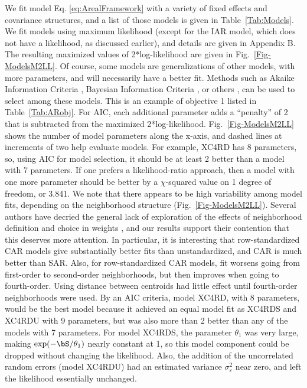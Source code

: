 We fit model Eq. \ref{eq:ArealFramework} with a variety of fixed effects and covariance structures, and a list of those models is given in Table~\ref{Tab:Models}.  We fit models using maximum likelihood (except for the IAR model, which does not have a likelihood, as discussed earlier), and details are given in Appendix B. The resulting maximized values of 2*log-likelihood are given in Fig.~\ref{Fig-ModelsM2LL}. Of course, some models are generalizations of other models, with more parameters, and will necessarily have a better fit.  Methods such as Akaike Information Criteria \citep[AIC,][]{Akai:Info:1973}, Bayesian Information Criteria \citep[BIC,][]{Schw:esti:1978}, or others \citep[see, e.g.,][]{Burn:Ande:mode:2002,Hoot:Hobb:guid:2015}, can be used to select among these models. This is an example of objective 1 listed in Table~\ref{Tab:ARobj}. For AIC, each additional parameter adds a ``penalty'' of 2 that is subtracted from the maximized 2*log-likelihood.  Fig.~\ref{Fig-ModelsM2LL} shows the number of model parameters along the x-axis, and dashed lines at increments of two help evaluate models. For example, XC4RD has 8 parameters, so, using AIC for model selection, it should be at least 2 better than a model with 7 parameters.  If one prefers a likelihood-ratio approach, then a model with one more parameter should be better by a $\chi$-squared value on 1 degree of freedom, or 3.841. We note that there appears to be high variability among model fits, depending on the neighborhood structure (Fig.~\ref{Fig-ModelsM2LL}).  Several authors have decried the general lack of exploration of the effects of neighborhood definition and choice in weights \citep{Best:Cock:Benn:Wake:Elli:ecol:2001,Earn:Morg:Meng:Ryan:Summ:Bear:eval:2007}, and our results support their contention that this deserves more attention.  In particular, it is interesting that row-standardized CAR models give substantially better fits than unstandardized, and CAR is much better than SAR. Also, for row-standardized CAR models, fit worsens going from first-order to second-order neighborhoods, but then improves when going to fourth-order.  Using distance between centroids had little effect until fourth-order neighborhoods were used.  By an AIC criteria, model XC4RD, with 8 parameters, would be the best model because it achieved an equal model fit as XC4RDS and XC4RDU with 9 parameters, but was also more than 2 better than any of the models with 7 parameters. For model XC4RDS, the parameter $\theta_1$ was very large, making $\exp(-\bS/\theta_1)$ nearly constant at 1, so this model component could be dropped without changing the likelihood.  Also, the addition of the uncorrelated random errors (model XC4RDU) had an estimated variance $\sigma_\varepsilon^2$ near zero, and left the likelihood essentially unchanged. 

